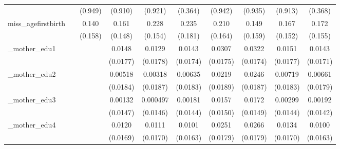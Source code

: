 \begin{table}[htbp]
\begin{tabular}{l*{9}{c}}
            &                     &     (0.949)         &     (0.910)         &     (0.921)         &     (0.364)         &     (0.942)         &     (0.935)         &     (0.913)         &     (0.368)         \\
[1em]
miss\_agefirstbirth&                     &       0.140         &       0.161         &       0.228         &       0.235         &       0.210         &       0.149         &       0.167         &       0.172         \\
            &                     &     (0.158)         &     (0.148)         &     (0.154)         &     (0.181)         &     (0.164)         &     (0.159)         &     (0.152)         &     (0.155)         \\
[1em]
\_mother\_edu1&                     &                     &      0.0148         &      0.0129         &      0.0143         &      0.0307\sym{*}  &      0.0322\sym{*}  &      0.0151         &      0.0143         \\
            &                     &                     &    (0.0177)         &    (0.0178)         &    (0.0174)         &    (0.0175)         &    (0.0174)         &    (0.0177)         &    (0.0171)         \\
[1em]
\_mother\_edu2&                     &                     &     0.00518         &     0.00318         &     0.00635         &      0.0219         &      0.0246         &     0.00719         &     0.00661         \\
            &                     &                     &    (0.0184)         &    (0.0187)         &    (0.0183)         &    (0.0189)         &    (0.0187)         &    (0.0183)         &    (0.0179)         \\
[1em]
\_mother\_edu3&                     &                     &     0.00132         &    0.000497         &     0.00181         &      0.0157         &      0.0172         &     0.00299         &     0.00192         \\
            &                     &                     &    (0.0147)         &    (0.0146)         &    (0.0144)         &    (0.0150)         &    (0.0149)         &    (0.0144)         &    (0.0142)         \\
[1em]
\_mother\_edu4&                     &                     &      0.0120         &      0.0111         &      0.0101         &      0.0251         &      0.0266         &      0.0134         &      0.0100         \\
            &                     &                     &    (0.0169)         &    (0.0170)         &    (0.0163)         &    (0.0179)         &    (0.0179)         &    (0.0170)         &    (0.0163)         \\

\end{tabular}
\end{table}
